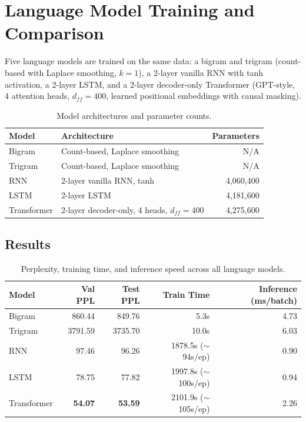 \documentclass[11pt]{article}
\begin{document}
\section{Language Model Training and Comparison}

Five language models are trained on the same data: a bigram and trigram (count-based with Laplace smoothing, $k{=}1$), a 2-layer vanilla RNN with tanh activation, a 2-layer LSTM, and a 2-layer decoder-only Transformer (GPT-style, 4 attention heads, $d_{ff}{=}400$, learned positional embeddings with causal masking).

\begin{table}[H]
\centering\small
\begin{tabular}{llr}
\toprule
\textbf{Model} & \textbf{Architecture} & \textbf{Parameters} \\
\midrule
Bigram & Count-based, Laplace smoothing & N/A \\
Trigram & Count-based, Laplace smoothing & N/A \\
RNN & 2-layer vanilla RNN, tanh & 4,060,400 \\
LSTM & 2-layer LSTM & 4,181,600 \\
Transformer & 2-layer decoder-only, 4 heads, $d_{ff}{=}400$ & 4,275,600 \\
\bottomrule
\end{tabular}
\caption{Model architectures and parameter counts.}
\label{tab:models}
\end{table}

\subsection{Results}

\begin{table}[H]
\centering\small
\begin{tabular}{lrrrr}
\toprule
\textbf{Model} & \textbf{Val PPL} & \textbf{Test PPL} & \textbf{Train Time} & \textbf{Inference (ms/batch)} \\
\midrule
Bigram & 860.44 & 849.76 & 5.3s & 4.73 \\
Trigram & 3791.59 & 3735.70 & 10.0s & 6.03 \\
RNN & 97.46 & 96.26 & 1878.5s ($\sim$94s/ep) & 0.90 \\
LSTM & 78.75 & 77.82 & 1997.8s ($\sim$100s/ep) & 0.94 \\
Transformer & \textbf{54.07} & \textbf{53.59} & 2101.9s ($\sim$105s/ep) & 2.26 \\
\bottomrule
\end{tabular}
\caption{Perplexity, training time, and inference speed across all language models.}
\label{tab:ppl}
\end{table}
\end{document}
